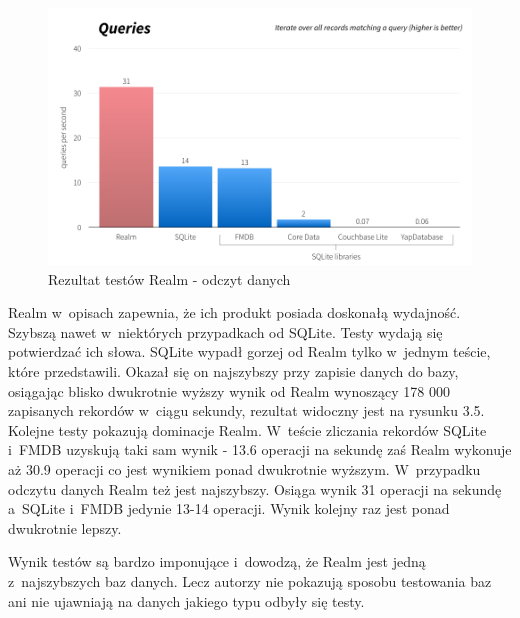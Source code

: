 \begin{figure}
\centering
	\includegraphics[width=\linewidth]{img/realm_query_test.png}
	\caption{Rezultat testów Realm - odczyt danych}
	\label{fig: realm_query_test}
\end{figure}
\clearpage

Realm w~opisach zapewnia, że ich produkt posiada doskonałą wydajność. Szybszą nawet w~niektórych przypadkach od SQLite. Testy wydają się potwierdzać ich słowa. SQLite wypadł gorzej od Realm tylko w~jednym teście, które przedstawili. Okazał się on najszybszy przy zapisie danych do bazy, osiągając blisko dwukrotnie wyższy wynik od Realm wynoszący 178 000 zapisanych rekordów w~ciągu sekundy, rezultat widoczny jest na rysunku 3.5. Kolejne testy pokazują dominacje Realm. W~teście zliczania rekordów SQLite i~FMDB uzyskują taki sam wynik - 13.6 operacji na sekundę zaś Realm wykonuje aż 30.9 operacji co jest wynikiem ponad dwukrotnie wyższym. W~przypadku odczytu danych Realm też jest najszybszy. Osiąga wynik 31 operacji na sekundę a~SQLite i~FMDB jedynie 13-14 operacji. Wynik kolejny raz jest ponad dwukrotnie lepszy. \par 
Wynik testów są bardzo imponujące i~dowodzą, że Realm jest jedną z~najszybszych baz danych. Lecz autorzy nie pokazują sposobu testowania baz ani nie ujawniają na danych jakiego typu odbyły się testy.